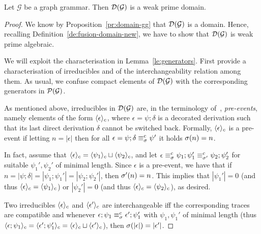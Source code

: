 \begin{theorem}
  \label{th:fusion-domain-for-gg}
  Let $\mathcal{G}$ be a graph grammar. Then
  $\mathcal{D}({\mathcal{G}})$ is a weak prime domain.
\end{theorem}

\begin{proof}
  We know by Proposition~\ref{pr:domain-gg} that $\mathcal{D}({\mathcal{G}})$
  is a domain. Hence, recalling Definition~\ref{de:fusion-domain-new},
  we have to show that $\mathcal{D}({\mathcal{G}})$ is weak prime
  algebraic. 

  We will exploit the characterisation in
  Lemma~\ref{le:generators}. First provide a characterisation of
  irreducibles and of the interchangeability relation among them. As
  usual, we confuse compact elements of $\mathcal{D}({\mathcal{G}})$ with the
  corresponding generators in $\mathcal{P}({\mathcal{G}})$.

  \medskip

  As mentioned above, irreducibles in $\mathcal{D}({\mathcal{G}})$ are, in the
  terminology of~\cite{Handbook,Bal:PhD}, \emph{pre-events}, namely
  elements of the form $\langle {\epsilon}\rangle_c$, where
  $\epsilon = \psi; \delta$ is a decorated derivation such that its
  last direct derivation $\delta$ cannot be switched back. Formally,
  $\langle {\epsilon}\rangle_c$ is a pre-event if letting $n = |\epsilon|$ then
  for all $\epsilon = \psi; \delta \equiv^c_\sigma \psi'$ it holds
  $\sigma(n) = n$.

  In fact, assume that
  $\langle {\epsilon}\rangle_c = \langle {\psi_1}\rangle_c \sqcup \langle {\psi_2}\rangle_c$, and
  let
  $\epsilon  \equiv^c_\sigma \psi_1 ; \psi_1' \equiv^c_{\sigma'} \psi_2;
  \psi_2'$ for suitable $\psi_1', \psi_2'$ of minimal length. 
  Since $\epsilon$ is a pre-event, we have that if
  $n = |\psi; \delta| = |\psi_1 ; \psi_1'| = |\psi_2 ; \psi_2'|$, then
  $\sigma'(n) = n$. This implies that $|\psi_1'| = 0$ (and thus
  $\langle {\epsilon}\rangle_c = \langle {\psi_1}\rangle_c$) or $|\psi_2'| = 0$ (and thus
  $\langle {\epsilon}\rangle_c = \langle {\psi_2}\rangle_c$),
  as desired. 


   \medskip

   Two irreducibles $\langle {\epsilon}\rangle_c$ and $\langle {\epsilon'}\rangle_c$ are
   interchangeable iff the corresponding traces are compatible and
   whenever $\epsilon; \psi_1 \equiv^c_{\sigma} \epsilon' ; \psi_1'$
   with $\psi_1, \psi_1'$ of minimal length (thus
   $\langle {\epsilon; \psi_1}\rangle_c = \langle {\epsilon'; \psi'_1}\rangle_c =
   \langle {\epsilon}\rangle_c \sqcup \langle {\epsilon'}\rangle_c$), then
   $\sigma(|\epsilon|) = |\epsilon'|$.


\end{proof}
